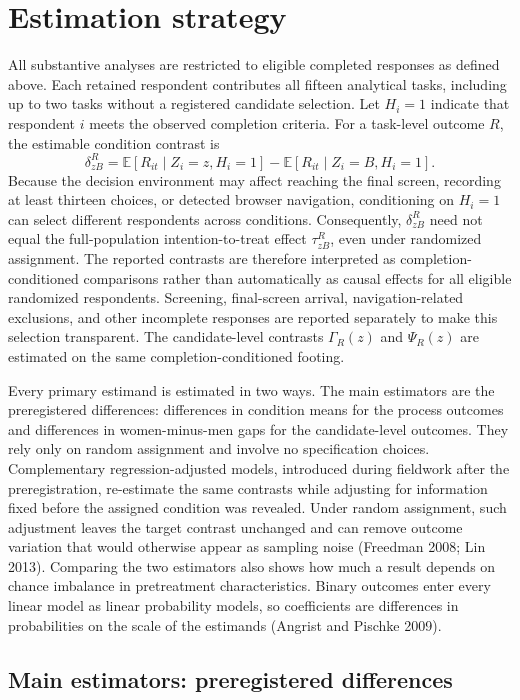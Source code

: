 \documentclass[11pt]{article}\usepackage[]{graphicx}\usepackage[]{xcolor}
\newcommand{\E}{\mathbb{E}}
\begin{document}
\section{Estimation strategy}
\label{sec:estimation}

All substantive analyses are restricted to eligible completed responses as defined above. Each retained respondent contributes all fifteen analytical tasks, including up to two tasks without a registered candidate selection. Let $H_i=1$ indicate that respondent $i$ meets the observed completion criteria. For a task-level outcome $R$, the estimable condition contrast is
\[
\delta^R_{zB}=\E[R_{it}\mid Z_i=z,H_i=1]-\E[R_{it}\mid Z_i=B,H_i=1].
\]
Because the decision environment may affect reaching the final screen, recording at least thirteen choices, or detected browser navigation, conditioning on $H_i=1$ can select different respondents across conditions. Consequently, $\delta^R_{zB}$ need not equal the full-population intention-to-treat effect $\tau^R_{zB}$, even under randomized assignment. The reported contrasts are therefore interpreted as completion-conditioned comparisons rather than automatically as causal effects for all eligible randomized respondents. Screening, final-screen arrival, navigation-related exclusions, and other incomplete responses are reported separately to make this selection transparent. The candidate-level contrasts $\Gamma_R(z)$ and $\Psi_R(z)$ are estimated on the same completion-conditioned footing.

Every primary estimand is estimated in two ways. The main estimators are the preregistered differences: differences in condition means for the process outcomes and differences in women-minus-men gaps for the candidate-level outcomes. They rely only on random assignment and involve no specification choices. Complementary regression-adjusted models, introduced during fieldwork after the preregistration, re-estimate the same contrasts while adjusting for information fixed before the assigned condition was revealed. Under random assignment, such adjustment leaves the target contrast unchanged and can remove outcome variation that would otherwise appear as sampling noise (Freedman 2008; Lin 2013). Comparing the two estimators also shows how much a result depends on chance imbalance in pretreatment characteristics. Binary outcomes enter every linear model as linear probability models, so coefficients are differences in probabilities on the scale of the estimands (Angrist and Pischke 2009).

\subsection{Main estimators: preregistered differences}
\end{document}
